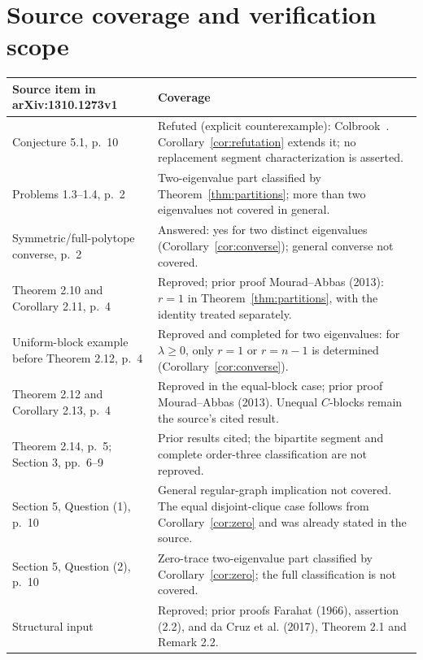 \documentclass[11pt]{article}
\begin{document}
\section{Source coverage and verification scope}
\begingroup\small
\noindent\begin{tabular}{@{}>{\raggedright\arraybackslash}p{}>{\raggedright\arraybackslash}p{}@{}}
\toprule
Source item in arXiv:1310.1273v1 & Coverage\\
\midrule
Conjecture 5.1, p.~10 & Refuted (explicit counterexample): Colbrook~\cite{Colbrook}. Corollary~\ref{cor:refutation} extends it; no replacement segment characterization is asserted.\\[3pt]
Problems 1.3--1.4, p.~2 & Two-eigenvalue part classified by Theorem~\ref{thm:partitions}; more than two eigenvalues not covered in general.\\[3pt]
Symmetric/full-polytope converse, p.~2 & Answered: yes for two distinct eigenvalues (Corollary~\ref{cor:converse}); general converse not covered.\\[3pt]
Theorem 2.10 and Corollary 2.11, p.~4 & Reproved; prior proof Mourad--Abbas (2013): $r=1$ in Theorem~\ref{thm:partitions}, with the identity treated separately.\\[3pt]
Uniform-block example before Theorem 2.12, p.~4 & Reproved and completed for two eigenvalues: for $\lambda\geq0$, only $r=1$ or $r=n-1$ is determined (Corollary~\ref{cor:converse}).\\[3pt]
Theorem 2.12 and Corollary 2.13, p.~4 & Reproved in the equal-block case; prior proof Mourad--Abbas (2013). Unequal $C$-blocks remain the source's cited result.\\[3pt]
Theorem 2.14, p.~5; Section 3, pp.~6--9 & Prior results cited; the bipartite segment and complete order-three classification are not reproved.\\[3pt]
Section 5, Question (1), p.~10 & General regular-graph implication not covered. The equal disjoint-clique case follows from Corollary~\ref{cor:zero} and was already stated in the source.\\[3pt]
Section 5, Question (2), p.~10 & Zero-trace two-eigenvalue part classified by Corollary~\ref{cor:zero}; the full classification is not covered.\\
Structural input & Reproved; prior proofs Farahat (1966), assertion (2.2), and da Cruz et al. (2017), Theorem 2.1 and Remark 2.2.\\
\bottomrule
\end{tabular}
\endgroup
\smallskip
\end{document}
